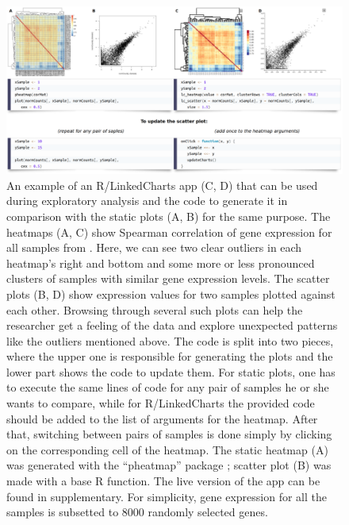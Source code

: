 \documentclass[twocolumn,10pt]{article}
\begin{document}
\begin{figure}[t]
  \includegraphics[width=\textwidth]{FigE/figE.png}
  \caption{ An example of an R/LinkedCharts app (C, D) that can be used during exploratory analysis and the code to generate it in comparison with the static plots (A, B) for the same purpose. The heatmaps (A, C) show Spearman correlation of gene expression for all samples from \citet{conway_2015}. Here, we can see two clear outliers in each heatmap's right and bottom and some more or less pronounced clusters of samples with similar gene expression levels. The scatter plots (B, D) show expression values for two samples plotted against each other. Browsing through several such plots can help the researcher get a feeling of the data and explore unexpected patterns like the outliers mentioned above. The code is split into two pieces, where the upper one is responsible for generating the plots and the lower part shows the code to update them. For static plots, one has to execute the same lines of code for any pair of samples he or she wants to compare, while for R/LinkedCharts the provided code should be added to the list of arguments for the heatmap. After that, switching between pairs of samples is done simply by clicking on the corresponding cell of the heatmap. The static heatmap (A) was generated with the ``pheatmap'' package  \citep{kolde_2019}; scatter plot (B) was made with a base R function. The live version of the app can be found in supplementary. For simplicity, gene expression for all the samples is subsetted to 8000 randomly selected genes.}
  \label{FigE}
\end{figure}
\end{document}
